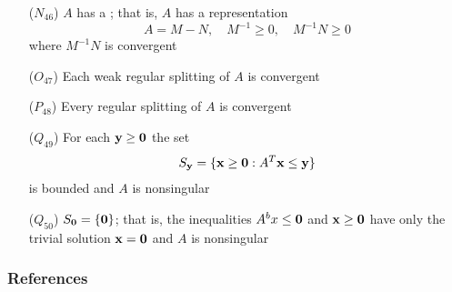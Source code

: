 \documentclass[aspectratio=169]{beamer}
\begin{document}
\begin{frame}
\addtocounter{theorem}{-1}
\begin{theorem}[Continued]
\begin{enumerate}
\item[($N_{46}$)] $A$ has a ; that is, $A$ has a representation
\[
A=M-N,\quad M^{-1}\geq 0,\quad M^{-1}N\geq 0
\]
where $M^{-1}N$ is convergent
\item[($O_{47}$)] Each weak regular splitting of $A$ is convergent
\item[($P_{48}$)] Every regular splitting of $A$ is convergent
\item[($Q_{49}$)] For each $\by\geq\b0$ the set
\[
S_\by=\{\bx\geq\b0: A^T\bx\leq\by\}
\]
is bounded and $A$ is nonsingular
\item[($Q_{50}$)] $S_\b0=\{\b0\}$; that is, the inequalities $A^bx\leq\b0$ and $\bx\geq\b0$ have only the trivial solution $\bx=\b0$ and $A$ is nonsingular
\end{enumerate}
\end{theorem}
\end{frame}


\begin{frame}[allowframebreaks]
    \frametitle{References}
    
    
\end{frame}
    
\end{document}
